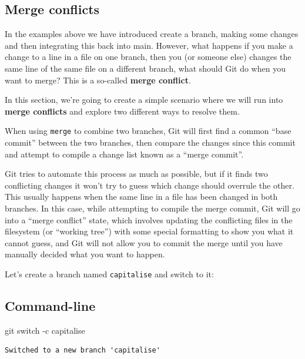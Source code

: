 \documentclass[
  letterpaper,
  DIV=11,
  numbers=noendperiod]{scrartcl}
\newenvironment{Shaded}{\begin{snugshade}}{\end{snugshade}}
\newcommand{\ControlFlowTok}[1]{\textcolor[rgb]{0.00,0.23,0.31}{#1}}
\newcommand{\NormalTok}[1]{\textcolor[rgb]{0.00,0.23,0.31}{#1}}
\newcommand{\SpecialCharTok}[1]{\textcolor[rgb]{0.37,0.37,0.37}{#1}}
\begin{document}
\subsection{Merge conflicts}\label{merge-conflicts}

In the examples above we have introduced create a branch, making some
changes and then integrating this back into main. However, what happens
if you make a change to a line in a file on one branch, then you (or
someone else) changes the same line of the same file on a different
branch, what should Git do when you want to merge? This is a so-called
\textbf{merge conflict}.

In this section, we're going to create a simple scenario where we will
run into \textbf{merge conflicts} and explore two different ways to
resolve them.

When using \texttt{merge} to combine two branches, Git will first find a
common ``base commit'' between the two branches, then compare the
changes since this commit and attempt to compile a change list known as
a ``merge commit''.

Git tries to automate this process as much as possible, but if it finds
two conflicting changes it won't try to guess which change should
overrule the other. This usually happens when the same line in a file
has been changed in both branches. In this case, while attempting to
compile the merge commit, Git will go into a ``merge conflict'' state,
which involves updating the conflicting files in the filesystem (or
``working tree'') with some special formatting to show you what it
cannot guess, and Git will not allow you to commit the merge until you
have manually decided what you want to happen.

Let's create a branch named \texttt{capitalise} and switch to it:

\subsection{Command-line}

\begin{Shaded}
\begin{Highlighting}[]
\NormalTok{git }\ControlFlowTok{switch} \SpecialCharTok{{-}}\NormalTok{c capitalise}
\end{Highlighting}
\end{Shaded}

\begin{verbatim}
Switched to a new branch 'capitalise'
\end{verbatim}
\end{document}
